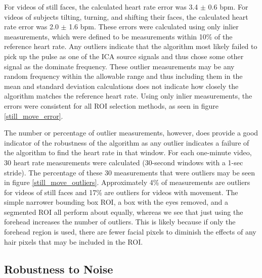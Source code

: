 \documentclass[10pt,twocolumn,letterpaper]{article}
\begin{document}
For videos of still faces, the calculated heart rate error was 3.4 $\pm$ 0.6 bpm. For videos of subjects tilting, turning, and shifting their faces, the calculated heart rate error was 2.0 $\pm$ 1.6 bpm. These errors were calculated using only inlier measurements, which were defined to be measurements within 10\% of the reference heart rate. Any outliers indicate that the algorithm most likely failed to pick up the pulse as one of the ICA source signals and thus chose some other signal as the dominate frequency. These outlier measurements may be any random frequency within the allowable range and thus including them in the mean and standard deviation calculations does not indicate how closely the algorithm matches the reference heart rate. Using only inlier measurements, the errors were consistent for all ROI selection methods, as seen in figure \ref{still_move_error}. 

The number or percentage of outlier measurements, however, does provide a good indicator of the robustness of the algorithm as any outlier indicates a failure of the algorithm to find the heart rate in that window. For each one-minute video, 30 heart rate measurements were calculated (30-second windows with a 1-sec stride). The percentage of these 30 measurements that were outliers may be seen in figure \ref{still_move_outliers}. Approximately 4\% of measurements are outliers for videos of still faces and 17\% are outliers for videos with movement. The simple narrower bounding box ROI, a box with the eyes removed, and a segmented ROI all perform about equally, whereas we see that just using the forehead increases the number of outliers. This is likely because if only the forehead region is used, there are fewer facial pixels to diminish the effects of any hair pixels that may be included in the ROI.

\subsection{Robustness to Noise} \label{robust_noise}
\end{document}
